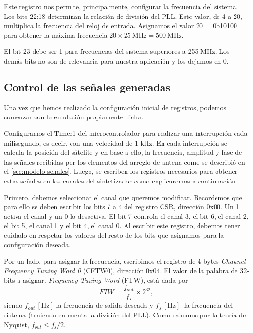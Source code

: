 \documentclass{article}
\newenvironment{standalone}{\begin{preview}}{\end{preview}}
\begin{document}
\begin{standalone}
  Este registro nos permite, principalmente, configurar la frecuencia del sistema.
  Los bits 22:18 determinan la relación de división del PLL.
  Este valor, de 4 a 20, multiplica la frecuencia del reloj de entrada.
  Asignamos el valor 20 = 0b10100 para obtener la máxima frecuencia $20 \times 25 \ \si{\mega\hertz} = 500 \ \si{\mega\hertz}$.

  El bit 23 debe ser 1 para frecuencias del sistema superiores a 255 MHz.
  Los demás bits no son de relevancia para nuestra aplicación y los dejamos en 0.

  \subsection{Control de las señales generadas}

  Una vez que hemos realizado la configuración inicial de registros, podemos comenzar con la emulación propiamente dicha.

  Configuramos el Timer1 del microcontrolador para realizar una interrupción cada milisegundo, es decir, con una velocidad de 1 kHz.
  En cada interrupción se calcula la posición del sátelite y en base a ello, la frecuencia, amplitud y fase de las señales recibidas por los elementos del arreglo de antena como se describió en el \cref{sec:modelo-senales}.
  Luego, se escriben los registros necesarios para obtener estas señales en los canales del sintetizador como explicaremos a continuación.

  Primero, debemos seleccionar el canal que queremos modificar.
  Recordemos que para ello se deben escribir los bits 7 a 4 del registro CSR, dirección 0x00.
  Un 1 activa el canal y un 0 lo desactiva.
  El bit 7 controla el canal 3, el bit 6, el canal 2, el bit 5, el canal 1 y el bit 4, el canal 0.
  Al escribir este registro, debemos tener cuidado en respetar los valores del resto de los bits que asignamos para la configuración deseada.

  Por un lado, para asignar la frecuencia, escribimos el registro de 4-bytes \textit{Channel Frequency Tuning Word 0} (CFTW0), dirección 0x04.
  El valor de la palabra de 32-bits a asignar, \textit{Frequency Tuning Word} (FTW), está dada por
  \begin{equation}
    FTW = \frac{ f_{out} }{ f_s } \times 2^{32},
  \end{equation}
  siendo $f_{out} \ [\si{\hertz}]$ la frecuencia de salida deseada y $f_s \ [\si{\hertz}]$, la frecuencia del sistema (teniendo en cuenta la división del PLL).
  Como sabemos por la teoría de Nyquist, $f_{out} \leq f_s / 2$.


\end{standalone}
\end{document}

